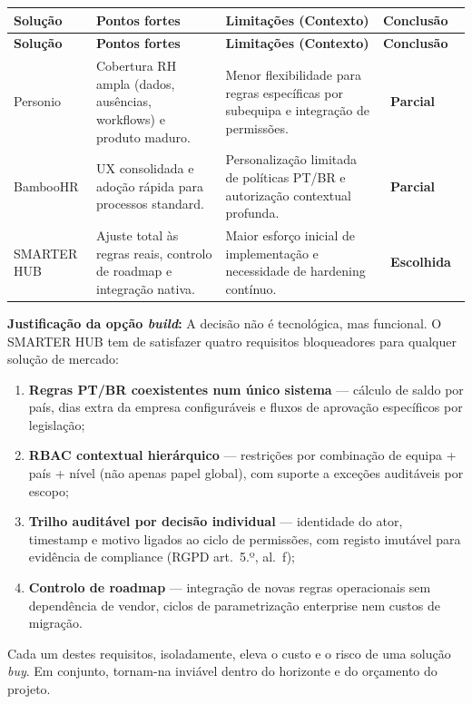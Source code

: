 \documentclass[11pt,a4paper,twoside]{article}
\newcommand{\tagn}[1]{{\setlength{\fboxsep}{1.5pt}\colorbox{TAGNEUTRAL}{\scriptsize\sffamily\bfseries\color{white}~#1~}}}
\newcommand{\tH}[1]{\textbf{\sffamily\small\color{white}#1}}
\newcommand{\theadrow}{\rowcolor{ACCENT}}
\begin{document}
\begin{longtable}{>{\small\bfseries}p{2cm} >{\small\raggedright\arraybackslash}p{4.2cm} >{\small\raggedright\arraybackslash}p{5cm} >{\small\centering\arraybackslash}p{1.8cm}}
\theadrow
\tH{Solução} & \tH{Pontos fortes} & \tH{Limitações (Contexto)} & \tH{Conclusão} \\
\midrule
\endfirsthead
\theadrow
\tH{Solução} & \tH{Pontos fortes} & \tH{Limitações (Contexto)} & \tH{Conclusão} \\
\midrule
\endhead

Personio & Cobertura RH ampla (dados, ausências, workflows) e produto maduro. & Menor flexibilidade para regras específicas por subequipa e integração de permissões. & \tagn{Parcial} \\ \addlinespace[4pt]

BambooHR & UX consolidada e adoção rápida para processos standard. & Personalização limitada de políticas PT/BR e autorização contextual profunda. & \tagn{Parcial} \\ \addlinespace[4pt]

\rowcolor{blue!5} %
SMARTER HUB & Ajuste total às regras reais, controlo de roadmap e integração nativa. & Maior esforço inicial de implementação e necessidade de hardening contínuo. & \tagn{Escolhida} \\
\bottomrule
\end{longtable}

\begin{callout}
\textbf{Justificação da opção \textit{build}:} A decisão não é tecnológica, mas funcional. O SMARTER HUB tem de satisfazer quatro requisitos bloqueadores para qualquer solução de mercado:

\begin{enumerate}[leftmargin=1.8em, itemsep=3pt, topsep=4pt]
  \item \textbf{Regras PT/BR coexistentes num único sistema} --- cálculo de saldo por país, dias extra da empresa configuráveis e fluxos de aprovação específicos por legislação;
  \item \textbf{RBAC contextual hierárquico} --- restrições por combinação de equipa + país + nível (não apenas papel global), com suporte a exceções auditáveis por escopo;
  \item \textbf{Trilho auditável por decisão individual} --- identidade do ator, timestamp e motivo ligados ao ciclo de permissões, com registo imutável para evidência de compliance (RGPD art.\ 5.º, al.\ f);
  \item \textbf{Controlo de roadmap} --- integração de novas regras operacionais sem dependência de vendor, ciclos de parametrização enterprise nem custos de migração.
\end{enumerate}

Cada um destes requisitos, isoladamente, eleva o custo e o risco de uma solução \textit{buy}. Em conjunto, tornam-na inviável dentro do horizonte e do orçamento do projeto.
\end{callout}
\end{document}
